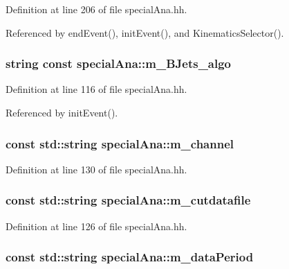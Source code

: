 Definition at line 206 of file special\-Ana.\-hh.



Referenced by end\-Event(), init\-Event(), and Kinematics\-Selector().

\subsubsection[{m\-\_\-\-B\-Jets\-\_\-algo}]{\setlength{\rightskip}{0pt plus 5cm}string const special\-Ana\-::m\-\_\-\-B\-Jets\-\_\-algo}\label{classspecialAna_adf4b91d17a05add2c475bad5ab72d414}


Definition at line 116 of file special\-Ana.\-hh.



Referenced by init\-Event().

\subsubsection[{m\-\_\-channel}]{\setlength{\rightskip}{0pt plus 5cm}const std\-::string special\-Ana\-::m\-\_\-channel}\label{classspecialAna_a71e9557d5927332677564f33668e8c80}


Definition at line 130 of file special\-Ana.\-hh.

\subsubsection[{m\-\_\-cutdatafile}]{\setlength{\rightskip}{0pt plus 5cm}const std\-::string special\-Ana\-::m\-\_\-cutdatafile}\label{classspecialAna_aac185c43fcd3fbaa8b869fb8bdba8b42}


Definition at line 126 of file special\-Ana.\-hh.

\subsubsection[{m\-\_\-data\-Period}]{\setlength{\rightskip}{0pt plus 5cm}const std\-::string special\-Ana\-::m\-\_\-data\-Period}\label{classspecialAna_a5962acc8cee4aa0fdb0f01caab08dd22}


